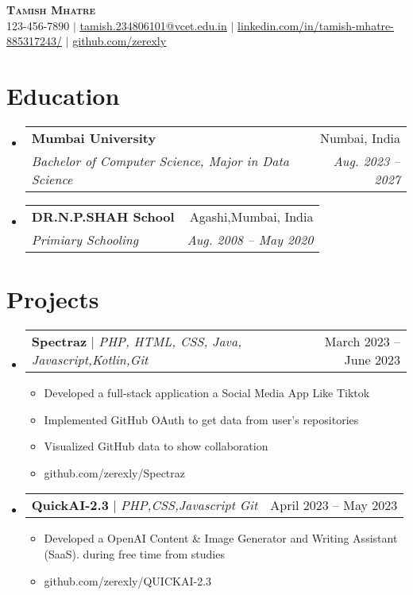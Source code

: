 \documentclass[letterpaper,11pt]{article}
\makeatletter
\newcommand{\resumeItem}[1]{
  \item\small{
    {#1 \vspace{-2pt}}
  }
}
\newcommand{\resumeSubheading}[4]{
  \vspace{-2pt}\item
    \begin{tabular*}{0.97\textwidth}[t]{l@{\extracolsep{\fill}}r}
      \textbf{#1} & #2 \\
      \textit{\small#3} & \textit{\small #4} \\
    \end{tabular*}\vspace{-7pt}
}
\newcommand{\resumeProjectHeading}[2]{
    \item
    \begin{tabular*}{0.97\textwidth}{l@{\extracolsep{\fill}}r}
      \small#1 & #2 \\
    \end{tabular*}\vspace{-7pt}
}
\newcommand{\resumeSubHeadingListStart}{\begin{itemize}[leftmargin=0.15in, label={}]}
\newcommand{\resumeSubHeadingListEnd}{\end{itemize}}
\newcommand{\resumeItemListStart}{\begin{itemize}}
\newcommand{\resumeItemListEnd}{\end{itemize}\vspace{-5pt}}
\makeatother
\begin{document}

\begin{center}
    \textbf{\Huge \scshape Tamish Mhatre} \\ \vspace{1pt}
    \small 123-456-7890 $|$ \href{mailto:x@x.com}{\underline{tamish.234806101@vcet.edu.in}} $|$ 
    \href{https://linkedin.com/in/...}{\underline{linkedin.com/in/tamish-mhatre-885317243/}} $|$
    \href{https://github.com/...}{\underline{github.com/zerexly}}
\end{center}


\section{Education}
  \resumeSubHeadingListStart
    \resumeSubheading
      {Mumbai University}{Numbai, India}
      {Bachelor of  Computer Science, Major in Data Science}{Aug. 2023 -- 2027}
    \resumeSubheading
      {DR.N.P.SHAH School}{Agashi,Mumbai, India}
      {Primiary Schooling}{Aug. 2008 -- May 2020}
  \resumeSubHeadingListEnd

\section{Projects}
    \resumeSubHeadingListStart
      \resumeProjectHeading
          {\textbf{Spectraz} $|$ \emph{PHP, HTML, CSS, Java, Javascript,Kotlin,Git}}{March 2023 -- June 2023}
          \resumeItemListStart
            \resumeItem{Developed a full-stack  application a Social Media App Like Tiktok}
            \resumeItem{Implemented GitHub OAuth to get data from user’s repositories}
            \resumeItem{Visualized GitHub data to show collaboration}
            \resumeItem{github.com/zerexly/Spectraz}
          \resumeItemListEnd
      \resumeProjectHeading
          {\textbf{QuickAI-2.3} $|$ \emph{PHP,CSS,Javascript Git}}{April 2023 -- May 2023}
          \resumeItemListStart
            \resumeItem{Developed a OpenAI Content & Image Generator and Writing Assistant (SaaS). during free time from studies}
            \resumeItem{github.com/zerexly/QUICKAI-2.3}
          \resumeItemListEnd
    \resumeSubHeadingListEnd
\end{document}
